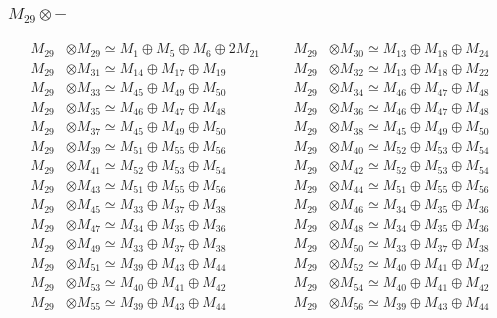 \subsubsection{$ M_{29}\otimes -$}
\begin{align*}
M_{29} &\otimes M_{29} \simeq M_{1} \oplus M_{5} \oplus M_{6} \oplus 2M_{21} &&& M_{29} &\otimes M_{30} \simeq M_{13} \oplus M_{18} \oplus M_{24}\\
M_{29} &\otimes M_{31} \simeq M_{14} \oplus M_{17} \oplus M_{19} &&& M_{29} &\otimes M_{32} \simeq M_{13} \oplus M_{18} \oplus M_{22}\\
M_{29} &\otimes M_{33} \simeq M_{45} \oplus M_{49} \oplus M_{50} &&& M_{29} &\otimes M_{34} \simeq M_{46} \oplus M_{47} \oplus M_{48}\\
M_{29} &\otimes M_{35} \simeq M_{46} \oplus M_{47} \oplus M_{48} &&& M_{29} &\otimes M_{36} \simeq M_{46} \oplus M_{47} \oplus M_{48}\\
M_{29} &\otimes M_{37} \simeq M_{45} \oplus M_{49} \oplus M_{50} &&& M_{29} &\otimes M_{38} \simeq M_{45} \oplus M_{49} \oplus M_{50}\\
M_{29} &\otimes M_{39} \simeq M_{51} \oplus M_{55} \oplus M_{56} &&& M_{29} &\otimes M_{40} \simeq M_{52} \oplus M_{53} \oplus M_{54}\\
M_{29} &\otimes M_{41} \simeq M_{52} \oplus M_{53} \oplus M_{54} &&& M_{29} &\otimes M_{42} \simeq M_{52} \oplus M_{53} \oplus M_{54}\\
M_{29} &\otimes M_{43} \simeq M_{51} \oplus M_{55} \oplus M_{56} &&& M_{29} &\otimes M_{44} \simeq M_{51} \oplus M_{55} \oplus M_{56}\\
M_{29} &\otimes M_{45} \simeq M_{33} \oplus M_{37} \oplus M_{38} &&& M_{29} &\otimes M_{46} \simeq M_{34} \oplus M_{35} \oplus M_{36}\\
M_{29} &\otimes M_{47} \simeq M_{34} \oplus M_{35} \oplus M_{36} &&& M_{29} &\otimes M_{48} \simeq M_{34} \oplus M_{35} \oplus M_{36}\\
M_{29} &\otimes M_{49} \simeq M_{33} \oplus M_{37} \oplus M_{38} &&& M_{29} &\otimes M_{50} \simeq M_{33} \oplus M_{37} \oplus M_{38}\\
M_{29} &\otimes M_{51} \simeq M_{39} \oplus M_{43} \oplus M_{44} &&& M_{29} &\otimes M_{52} \simeq M_{40} \oplus M_{41} \oplus M_{42}\\
M_{29} &\otimes M_{53} \simeq M_{40} \oplus M_{41} \oplus M_{42} &&& M_{29} &\otimes M_{54} \simeq M_{40} \oplus M_{41} \oplus M_{42}\\
M_{29} &\otimes M_{55} \simeq M_{39} \oplus M_{43} \oplus M_{44} &&& M_{29} &\otimes M_{56} \simeq M_{39} \oplus M_{43} \oplus M_{44}\\
\end{align*}

